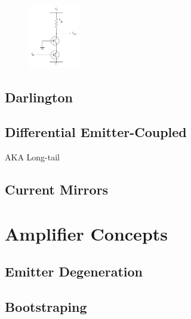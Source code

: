 \documentclass{report}
\newcommand{\imwidth}{0.2\textwidth}
\begin{document}
\begin{figure}
\centering
\includegraphics[width = \imwidth]{CascodeWithNegative}
\caption{}
\end{figure}


\section{Darlington}
\section{Differential Emitter-Coupled}
AKA Long-tail
\section{Current Mirrors}

\chapter{Amplifier Concepts}
\section{Emitter Degeneration}
\section{Bootstraping}
\end{document}
